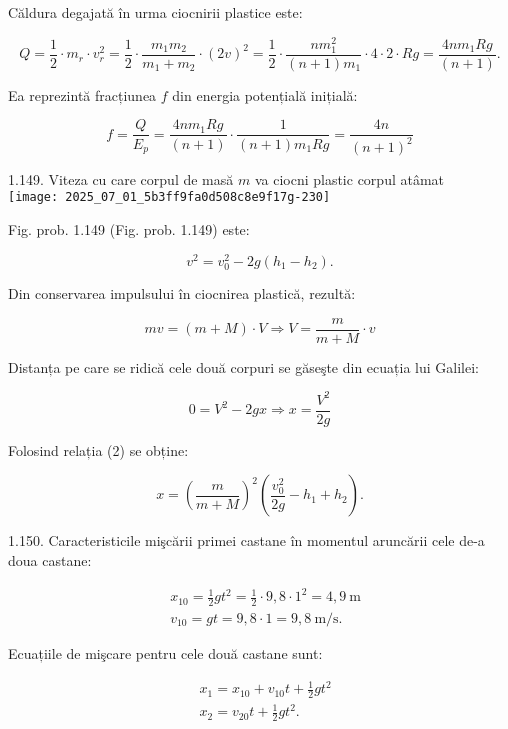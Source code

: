 Căldura degajată în urma ciocnirii plastice este:

$$
Q=\frac{1}{2} \cdot m_{r} \cdot v_{r}^{2}=\frac{1}{2} \cdot \frac{m_{1} m_{2}}{m_{1}+m_{2}} \cdot(2 v)^{2}=\frac{1}{2} \cdot \frac{n m_{1}^{2}}{(n+1) m_{1}} \cdot 4 \cdot 2 \cdot R g=\frac{4 n m_{1} R g}{(n+1)} .
$$

Ea reprezintă fracțiunea $f$ din energia potențială inițială:

$$
f=\frac{Q}{E_{p}}=\frac{4 n m_{1} R g}{(n+1)} \cdot \frac{1}{(n+1) m_{1} R g}=\frac{4 n}{(n+1)^{2}}
$$

1.149. Viteza cu care corpul de masă $m$ va ciocni plastic corpul atâmat\\
\texttt{[image: 2025\_07\_01\_5b3ff9fa0d508c8e9f17g-230]}

Fig. prob. 1.149 (Fig. prob. 1.149) este:


\begin{equation*}
v^{2}=v_{0}^{2}-2 g\left(h_{1}-h_{2}\right) . \tag{1}
\end{equation*}


Din conservarea impulsului în ciocnirea plastică, rezultă:


\begin{equation*}
m v=(m+M) \cdot V \Rightarrow V=\frac{m}{m+M} \cdot v \tag{2}
\end{equation*}


Distanța pe care se ridică cele două corpuri se găseşte din ecuația lui Galilei:

$$
0=V^{2}-2 g x \Rightarrow x=\frac{V^{2}}{2 g}
$$

Folosind relația (2) se obține:

$$
x=\left(\frac{m}{m+M}\right)^{2}\left(\frac{v_{0}^{2}}{2 g}-h_{1}+h_{2}\right) .
$$

1.150. Caracteristicile mişcării primei castane în momentul aruncării cele de-a doua castane:

$$
\begin{aligned}
& x_{10}=\frac{1}{2} g t^{2}=\frac{1}{2} \cdot 9,8 \cdot 1^{2}=4,9 \mathrm{~m} \\
& v_{10}=g t=9,8 \cdot 1=9,8 \mathrm{~m} / \mathrm{s} .
\end{aligned}
$$

Ecuațiile de mişcare pentru cele două castane sunt:

$$
\begin{aligned}
& x_{1}=x_{10}+v_{10} t+\frac{1}{2} g t^{2} \\
& x_{2}=v_{20} t+\frac{1}{2} g t^{2} .
\end{aligned}
$$

